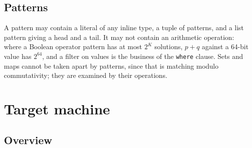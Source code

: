 \documentclass[10.5pt,a4paper]{extarticle}
\newcommand{\kw}[1]{\texttt{#1}}
\theoremstyle{definition}
\theoremstyle{remark}
\begin{document}
\subsection{Patterns}\label{sec:datapatterns}

A pattern may contain a literal of any inline type, a tuple of patterns, and
a list pattern giving a head and a tail. It may not contain an arithmetic
operation: where a Boolean operator pattern has at most $2^K$ solutions,
$p + q$ against a 64-bit value has $2^{64}$, and a filter on values is the
business of the \kw{where} clause. Sets and maps cannot be taken apart by
patterns, since that is matching modulo commutativity; they are examined by
their operations.

\section{Target machine}\label{sec:target}

\subsection{Overview}
\end{document}
